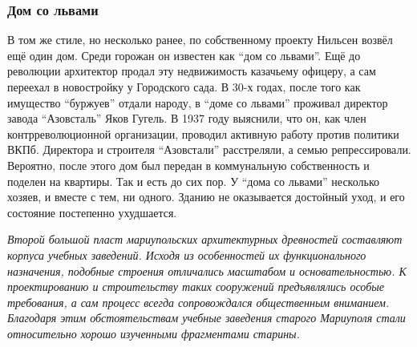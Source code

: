  
 
 
 
 

\subsubsection{Дом со львами}

В том же стиле, но несколько ранее, по собственному проекту Нильсен возвёл ещё
один дом. Среди горожан он известен как \enquote{дом со львами}. Ещё до революции
архитектор продал эту недвижимость казачьему офицеру, а сам переехал в
новостройку у Городского сада. В 30-х годах, после того как имущество \enquote{буржуев}
отдали народу, в \enquote{доме со львами} проживал директор завода \enquote{Азовсталь} Яков
Гугель. В 1937 году выяснили, что он, как член контрреволюционной организации,
проводил активную работу против политики ВКПб. Директора и строителя
\enquote{Азовстали} расстреляли, а семью репрессировали. Вероятно, после этого дом был
передан в коммунальную собственность и поделен на квартиры. Так и есть до сих
пор. У \enquote{дома со львами} несколько хозяев, и вместе с тем, ни одного. Зданию не
оказывается достойный уход, и его состояние постепенно ухудшается.


\emph{Второй большой пласт мариупольских архитектурных древностей составляют корпуса
учебных заведений. Исходя из особенностей их функционального назначения,
подобные строения отличались масштабом и основательностью. К проектированию и
строительству таких сооружений предъявлялись особые требования, а сам процесс
всегда сопровождался общественным вниманием. Благодаря этим обстоятельствам
учебные заведения старого Мариуполя стали относительно хорошо изученными
фрагментами старины.}


